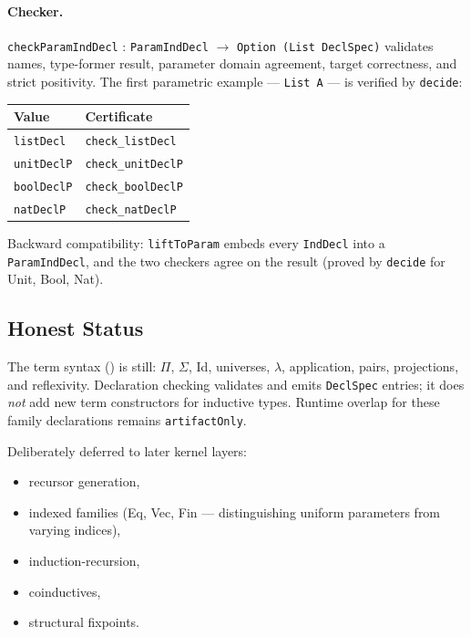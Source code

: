 \documentclass[11pt]{article}
\theoremstyle{remark}
\newcommand{\code}[1]{\texttt{#1}}
\newcommand{\codepath}[1]{\path{#1}}
\newcommand{\leanref}[1]{\texttt{#1}}
\begin{document}
\paragraph{Checker.}
\leanref{checkParamIndDecl} : \leanref{ParamIndDecl} $\to$
\leanref{Option (List DeclSpec)} validates names, type-former result, parameter
domain agreement, target correctness, and strict positivity.
The first parametric example --- \code{List A} --- is verified by
\code{decide}:

\begin{center}
\small
\begin{tabular}{@{}ll@{}}
\toprule
Value & Certificate \\
\midrule
\leanref{listDecl}   & \leanref{check\_listDecl} \\
\leanref{unitDeclP}  & \leanref{check\_unitDeclP} \\
\leanref{boolDeclP}  & \leanref{check\_boolDeclP} \\
\leanref{natDeclP}   & \leanref{check\_natDeclP} \\
\bottomrule
\end{tabular}
\end{center}

\noindent
Backward compatibility: \leanref{liftToParam} embeds every \leanref{IndDecl}
into a \leanref{ParamIndDecl}, and the two checkers agree on the result
(proved by \code{decide} for Unit, Bool, Nat).

\subsection{Honest Status}

The term syntax (\codepath{Syntax.lean}) is still:
$\Pi$, $\Sigma$, Id, universes, $\lambda$, application, pairs, projections,
and reflexivity.
Declaration checking validates and emits \leanref{DeclSpec} entries; it does
\emph{not} add new term constructors for inductive types.
Runtime overlap for these family declarations remains \code{artifactOnly}.

\noindent
Deliberately deferred to later kernel layers:
\begin{itemize}[nosep]
  \item recursor generation,
  \item indexed families (Eq, Vec, Fin --- distinguishing uniform parameters
  from varying indices),
  \item induction-recursion,
  \item coinductives,
  \item structural fixpoints.
\end{itemize}
\end{document}
